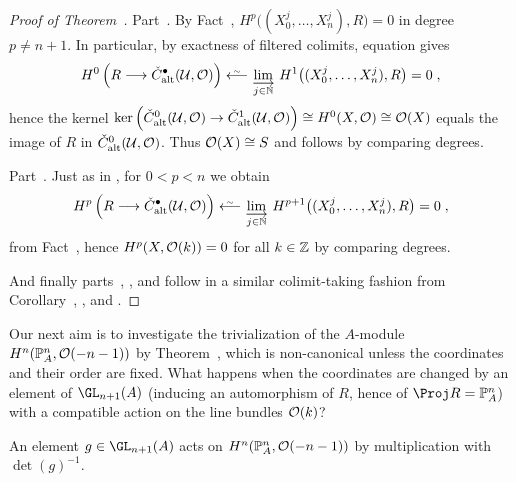 \documentclass[a4paper,parskip=half,numbers=enddot, DIV=12]{scrreprt}
\begin{document}
\begin{proof}[Proof of Theorem~]
	Part~. By Fact~, $H^p\big((X_0^j,\ldots,X_n^j),R\big)=0$ in degree $p\neq n+1$. In particular, by exactness of filtered colimits, equation  gives
	\begin{align*}
		H^0\left(R\morphism\check{C}_\alt^\bullet(\Uu,\Oo)\right)\lisomorphism\colimit[j\in\IN]H^1\big((X_0^j,\ldots,X_n^j),R\big)=0\;,
	\end{align*}
	hence the kernel $\ker\left(\check{C}_\alt^0(\Uu,\Oo)\morphism\check{C}_\alt^1(\Uu,\Oo)\right)\cong H^0(X,\Oo)\cong \Oo(X)$ equals the image of $R$ in $\check{C}_{\mathrm{alt}}^0(\mathcal{U},\mathcal{O})$. Thus $\mathcal{O}(X)\cong S$ and  follows by comparing degrees.
	
	Part~. Just as in , for $0<p<n$ we obtain
	\begin{align*}
		H^p\left(R\morphism\check{C}_\alt^\bullet(\Uu,\Oo)\right)\lisomorphism\colimit[j\in\IN]H^{p+1}\big((X_0^j,\ldots,X_n^j),R\big)=0\;,
	\end{align*}
	from Fact~, hence $H^p(X,\mathcal{O}(k))=0$ for all $k\in\mathbb{Z}$ by comparing degrees.
	
	And finally parts~, , and  follow in a similar colimit-taking fashion from Corollary~, , and .
\end{proof}
Our next aim is to investigate the trivialization of the $A$-module $H^n(\mathbb{P}_A^n,\mathcal{O}(-n-1))$ by Theorem~, which is non-canonical unless the coordinates and their order are fixed. What happens when the coordinates are changed by an element of $\GL_{n+1}(A)$ (inducing an automorphism of $R$, hence of $\Proj R=\IP_A^n$) with a compatible action on the line bundles $\mathcal{O}(k)$?
\begin{lem}
	An element $g\in\GL_{n+1}(A)$ acts on $H^n(\mathbb{P}_A^n,\mathcal{O}(-n-1))$ by multiplication with $\det(g)^{-1}$.
\end{lem}
\end{document}

